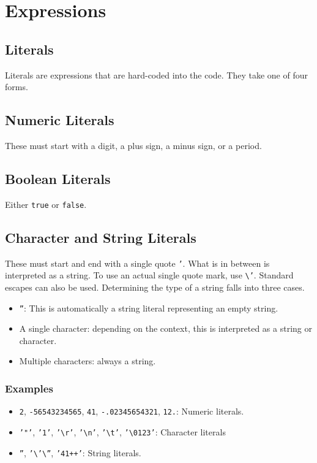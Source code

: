 \documentclass{article}
\newcommand{\code}[1]{\texttt{#1}}
\begin{document}
\section{Expressions}
\subsection{Literals}
Literals are expressions that are hard-coded into the code. They take one of four forms.
\subsection{Numeric Literals}
These must start with a digit, a plus sign, a minus sign, or a period.
\subsection{Boolean Literals}
Either \code{true} or \code{false}.
\subsection{Character and String Literals}
These must start and end with a single quote \code{'}. What is in between is interpreted as a string. To use an actual single quote mark, use \code{\textbackslash'}. Standard escapes can also be used. Determining the type of a string falls into three cases.
\begin{itemize}
\item \code{''}: This is automatically a string literal representing an empty string.
\item A single character: depending on the context, this is interpreted as a string or character.
\item Multiple characters: always a string.
\end{itemize}
\subsubsection{Examples}
\begin{itemize}
\item \code{2}, \code{-56543234565}, \code{41}, \code{-.02345654321}, \code{12.}: Numeric literals.
\item \code{'"'}, \code{'1'}, \code{'\textbackslash{}r'}, \code{'\textbackslash{}n'}, \code{'\textbackslash{}t'}, \code{'\textbackslash{}0123'}: Character literals
\item \code{''}, \code{'\textbackslash'\textbackslash''}, \code{'41++'}: String literals.
\end{itemize}
\end{document}
